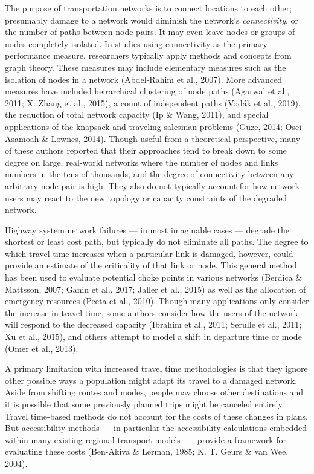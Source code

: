 \documentclass[
  letterpaper,
  number,
  review,
  3p]{elsarticle}
\begin{document}
The purpose of transportation networks is to connect locations to each
other; presumably damage to a network would diminish the network's
\emph{connectivity}, or the number of paths between node pairs. It may
even leave nodes or groups of nodes completely isolated. In studies
using connectivity as the primary performance measure, researchers
typically apply methods and concepts from graph theory. These measures
may include elementary measures such as the isolation of nodes in a
network (Abdel-Rahim et al., 2007). More advanced measures have included
heirarchical clustering of node paths (Agarwal et al., 2011; X. Zhang et
al., 2015), a count of independent paths (Vodák et al., 2019), the
reduction of total network capacity (Ip \& Wang, 2011), and special
applications of the knapsack and traveling salesman problems (Guze,
2014; Osei-Asamoah \& Lownes, 2014). Though useful from a theoretical
perspective, many of these authors reported that their approaches tend
to break down to some degree on large, real-world networks where the
number of nodes and links numbers in the tens of thousands, and the
degree of connectivity between any arbitrary node pair is high. They
also do not typically account for how network users may react to the new
topology or capacity constraints of the degraded network.

Highway system network failures --- in most imaginable cases --- degrade
the shortest or least cost path, but typically do not eliminate all
paths. The degree to which travel time increases when a particular link
is damaged, however, could provide an estimate of the criticality of
that link or node. This general method has been used to evaluate
potential choke points in various networks (Berdica \& Mattsson, 2007;
Ganin et al., 2017; Jaller et al., 2015) as well as the allocation of
emergency resources (Peeta et al., 2010). Though many applications only
consider the increase in travel time, some authors consider how the
users of the network will respond to the decreased capacity (Ibrahim et
al., 2011; Serulle et al., 2011; Xu et al., 2015), and others attempt to
model a shift in departure time or mode (Omer et al., 2013).

A primary limitation with increased travel time methodologies is that
they ignore other possible ways a population might adapt its travel to a
damaged network. Aside from shifting routes and modes, people may choose
other destinations and it is possible that some previously planned trips
might be canceled entirely. Travel time-based methods do not account for
the costs of these changes in plans. But accessibility methods --- in
particular the accessibility calculations embedded within many existing
regional transport models ---- provide a framework for evaluating these
costs (Ben-Akiva \& Lerman, 1985; K. T. Geurs \& van Wee, 2004).
\end{document}
